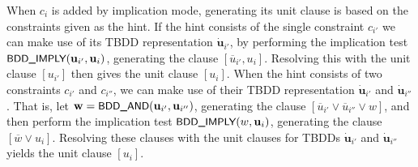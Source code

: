 \documentclass{easychair}
\renewcommand{\obar}[1]{\overline{#1}}
\newcommand{\trust}[1]{\dot {#1}}
\newcommand{\fname}[1]{\mbox{\small\sf #1}}
\newcommand{\node}[1]{\mathbf{#1}}
\newcommand{\nodeu}{\node{u}}
\newcommand{\nodew}{\node{w}}
\begin{document}
When $c_i$ is added by implication mode, generating its unit clause is
based on the constraints given as the hint.
If the hint consists of the
single constraint $c_{i'}$ we can make use of its TBDD representation
$\trust{\nodeu}_{i'}$, by performing the implication test
$\fname{BDD\_IMPLY}(\nodeu_{i'}, \nodeu_i)$, generating the clause
$[\obar{u}_{i'}, u_i]$.  Resolving this with the unit clause
$[u_{i'}]$ then gives the unit clause $[u_i]$.  When the hint consists
of two constraints $c_{i'}$ and $c_{i''}$, we can make use of their
TBDD representation $\trust{\nodeu}_{i'}$ and $\trust{\nodeu}_{i''}$.
That is, let $\nodew = \fname{BDD\_AND}(\nodeu_{i'}, \nodeu_{i''})$,
generating the clause
$[\obar{u}_{i'} \lor \obar{u}_{i''}  \lor w]$, and then
perform the implication test $\fname{BDD\_IMPLY}(w, \nodeu_i)$, generating the clause $[\obar{w} \lor u_i]$.
Resolving these clauses with the unit clauses for TBDDs
$\trust{\nodeu}_{i'}$ and $\trust{\nodeu}_{i''}$
yields the unit clause $[u_i]$.
\end{document}
